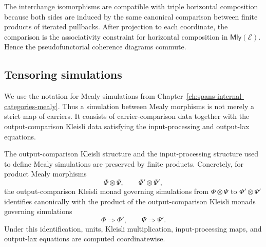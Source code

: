 The interchange isomorphisms are compatible with triple horizontal composition
because both sides are induced by the same canonical comparison between finite
products of iterated pullbacks. After projection to each coordinate, the
comparison is the associativity constraint for horizontal composition in
\(\mathsf{Mly}(\mathcal E)\). Hence the pseudofunctorial coherence diagrams
commute.

\subsection{Tensoring simulations}
\label{subsec:cmett-tensor-products-simulations}

We use the notation for Mealy simulations from
Chapter~\ref{ch:spans-internal-categories-mealy}. Thus a simulation between
Mealy morphisms is not merely a strict map of carriers. It consists of
carrier-comparison data together with the output-comparison Kleisli data
satisfying the input-processing and output-lax equations.

\begin{lemma}
\label{lem:cmett-product-comparison-structure}
    The output-comparison Kleisli structure and the input-processing structure
    used to define Mealy simulations are preserved by finite products.
    Concretely, for product Mealy morphisms
    \[
        \Phi\otimes\Psi,
        \qquad
        \Phi'\otimes\Psi',
    \]
    the output-comparison Kleisli monad governing simulations from
    \(\Phi\otimes\Psi\) to \(\Phi'\otimes\Psi'\) identifies canonically with
    the product of the output-comparison Kleisli monads governing simulations
    \[
        \Phi\Rightarrow\Phi',
        \qquad
        \Psi\Rightarrow\Psi'.
    \]
    Under this identification, units, Kleisli multiplication,
    input-processing maps, and output-lax equations are computed
    coordinatewise.
\end{lemma}


